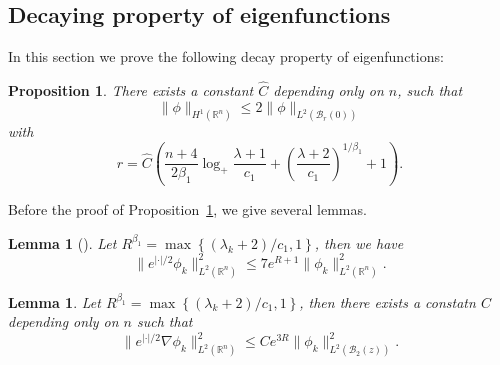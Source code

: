 \documentclass{article}
\numberwithin{equation}{section}
\newcommand\R{\ensuremath{\mathbb{R}}}
\newtheorem{lemma}[theorem]{Lemma}
\newtheorem{proposition}[theorem]{Proposition}
\numberwithin{equation}{section}
\theoremstyle{definition}
\begin{document}
\subsection{Decaying property of eigenfunctions}\label{subsec2.2h}

In this section we prove the following decay property of eigenfunctions:
\begin{proposition}\label{prp2.1}
	There exists a constant $\hat{C}$ depending only on $n$, such that 
	\begin{equation*}
		\|\phi\|_{H^1(\R^{n})}\le 2 \|\phi\|_{L^2\left( \mathcal{B}_r(0) \right) }
	\end{equation*}
	with 
	\begin{equation*}
		r=\hat{C}\left(  \frac{n+4}{2\beta_1}\log_+ \frac{\lambda+1}{c_1}+\left( \frac{\lambda+2}{c_1} \right) ^{1 /\beta_1}+1 \right). 
	\end{equation*}
\end{proposition}
Before the proof of Proposition~\ref{prp2.1}, we give several lemmas.
\begin{lemma}[{\cite[Proposition~2.3]{dicke2022spectral}}]\label{lma2.1}
	Let $R ^{ \beta_1}= \max \left\{ (\lambda_k+2) /c_1,1\right\} $, then we have
	\begin{equation}\label{2.1}
		\|e^{|\cdot | /2}\phi_k\|^2_{L^2(\R^{n})}\le 7e^{R+1}\|\phi_k\|^2_{L^2\left( \R^{n} \right) }. 
	\end{equation}
\end{lemma}

\begin{lemma}\label{lma2.2}
	Let $R^{\beta_1}= \max \left\{(\lambda_k+2) /c_1,1\right\} $, then there exists a constatn $C$ depending only on $n$ such that 
	\begin{equation}\label{2.2}
		\|e^{|\cdot | /2}\nabla \phi_k\|^2_{L^2(\R^{n})}\le C e^{3R} \|\phi_k\|^2_{L^2(\mathcal{B}_2(z))}.
	\end{equation}
\end{lemma}
 
\end{document}

